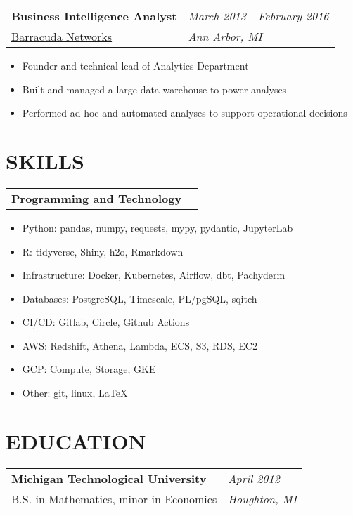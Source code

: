 \documentclass[margin,line]{res}
\begin{document}
\begin{resume}
\begin{tabular}{p{4.4in} l}
  {\bf Business Intelligence Analyst} & \emph{March 2013 - February 2016}\\
  \href{https://www.barracuda.com/}{Barracuda Networks} & \emph{Ann Arbor, MI}
\end{tabular}
\vspace{2pt}
\begin{itemize}\itemsep -2pt
  \item Founder and technical lead of Analytics Department
  \item Built and managed a large data warehouse to power analyses
  \item Performed ad-hoc and automated analyses to support operational decisions
\end{itemize}


\vspace{3pt}


\section{SKILLS}

\begin{tabular}{p{4.4in} l}
  {\bf Programming and Technology}
\end{tabular}
\vspace{2pt}
\begin{itemize} \itemsep -2pt
  \item Python: pandas, numpy, requests, mypy, pydantic, JupyterLab
  \item R: tidyverse, Shiny, h2o, Rmarkdown
  \item Infrastructure: Docker, Kubernetes, Airflow, dbt, Pachyderm
  \item Databases: PostgreSQL, Timescale, PL/pgSQL, sqitch
  \item CI/CD: Gitlab, Circle, Github Actions
  \item AWS: Redshift, Athena, Lambda, ECS, S3, RDS, EC2
  \item GCP: Compute, Storage, GKE
  \item Other: git, linux, \LaTeX
\end{itemize}


\vspace{3pt}


\section{EDUCATION}

\begin{tabular}{p{4.4in} l}
  {\bf Michigan Technological University} & \emph{April 2012} \\
  B.S. in Mathematics, minor in Economics & \emph{Houghton, MI} \\
\end{tabular}


\end{resume}
\end{document}
